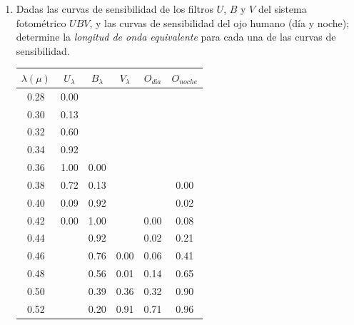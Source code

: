 \documentclass[10pt, spanish , a4paper, 1p]{elsarticle}
\begin{document}
  \begin{enumerate}[wide, labelwidth=!, labelindent=0pt, label=\textbf{\textrm{\arabic*)}}, ref=\arabic*]
    \item \label{prob:1} Dadas las curvas de sensibilidad de los filtros $U$, $B$ y $V$ del sistema fotométrico $UBV$, y las curvas de sensibilidad del ojo humano (día y noche); determine la \emph{longitud de onda equivalente} para cada una de las curvas de sensibilidad.

      \begin{table}[h!]
        \centering
        \begin{tabular}{ c | c | c | c | c | c }
          $\lambda(\mu)$ & $U_\lambda$ & $B_\lambda$ & $V_\lambda$ & $O_{\textit{d\'ia}}$ & $O_{noche}$ \\\hline
          0.28           & 0.00        &             &             &                   &      \\
          0.30           & 0.13        &             &             &                   &      \\
          0.32           & 0.60        &             &             &                   &      \\
          0.34           & 0.92        &             &             &                   &      \\
          0.36           & 1.00        & 0.00        &             &                   &      \\
          0.38           & 0.72        & 0.13        &             &                   & 0.00 \\
          0.40           & 0.09        & 0.92        &             &                   & 0.02 \\
          0.42           & 0.00        & 1.00        &             & 0.00              & 0.08 \\
          0.44           &             & 0.92        &             & 0.02              & 0.21 \\
          0.46           &             & 0.76        & 0.00        & 0.06              & 0.41 \\
          0.48           &             & 0.56        & 0.01        & 0.14              & 0.65 \\
          0.50           &             & 0.39        & 0.36        & 0.32              & 0.90 \\
          0.52           &             & 0.20        & 0.91        & 0.71              & 0.96 \\

\end{tabular}
\end{table}
\end{enumerate}
\end{document}
